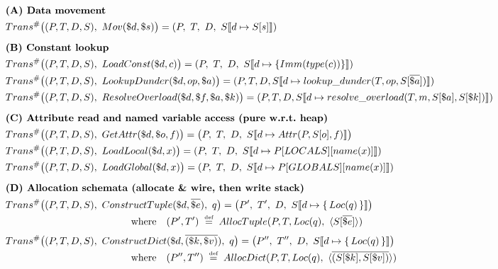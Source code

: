 \begin{figure*}[t]
\centering
\begin{align*}
&\textbf{(A) Data movement}\\
&Trans^\#\big((P,T,D,S),\ Mov(\$d,\$s)\big)
  = (P,\ T,\ D,\ S\llbracket d \mapsto S[s]\rrbracket)
\\[0.6em]
&\textbf{(B) Constant lookup}\\
&Trans^\#\big((P,T,D,S),\ LoadConst(\$d,c)\big)
  = (P,\ T,\ D,\ S\llbracket d \mapsto \{Imm(type(c))\}\rrbracket)
\\
&Trans^\#\big((P,T,D,S),\ LookupDunder(\$d,op,\$a)\big)=(P,T,D,S\llbracket d \mapsto lookup\_dunder(T, op, S[\overline{\$a}])\rrbracket)
\\
&Trans^\#\big((P,T,D,S),\ ResolveOverload(\$d,\$f,\$a,\$k)\big)=(P,T,D,S\llbracket d \mapsto resolve\_overload(T, m, S[\$a], S[\$k])\rrbracket)
\\[0.6em]
&\textbf{(C) Attribute read and named variable access (pure w.r.t.\  heap)}\\
&Trans^\#\big((P,T,D,S),\ GetAttr(\$d,\$o,f)\big)
  = \big(P,\ T,\ D,\ S\llbracket d \mapsto Attr(P,S[o],f)\rrbracket\big)
\\
&Trans^\#\big((P,T,D,S),\ LoadLocal(\$d,x)\big)
  = (P,\ T,\ D,\ S\llbracket d \mapsto P[LOCALS][name(x)]\rrbracket)
\\
&Trans^\#\big((P,T,D,S),\ LoadGlobal(\$d,x)\big)
  = (P,\ T,\ D,\ S\llbracket d \mapsto P[GLOBALS][name(x)]\rrbracket)
\\[0.6em]
&\textbf{(D) Allocation schemata (allocate \& wire, then write stack)}\\
&Trans^\#\big((P,T,D,S),\ ConstructTuple(\$d,\overline{\$e}),\ q\big)
  = \big(P',\ T',\ D,\ S\llbracket d \mapsto \{\,Loc(q)\,\}\rrbracket\big)
\\[-0.1em]
&\hspace{4.45cm}\text{where}\quad (P',T') \;\defeq\; AllocTuple(P,T,Loc(q),\ \langle S[\overline{\$e}]\rangle)
\\[0.25em]
&Trans^\#\big((P,T,D,S),\ ConstructDict(\$d,\overline{(\$k,\$v)}),\ q\big)
  = \big(P'',\ T'',\ D,\ S\llbracket d \mapsto \{\,Loc(q)\,\}\rrbracket\big)
\\[-0.1em]
&\hspace{4.45cm}\text{where}\quad (P'',T'') \;\defeq\; AllocDict(P,T,Loc(q),\ \langle \overline{(S[\$k],S[\$v])}\rangle)

\end{align*}
\end{figure*}
